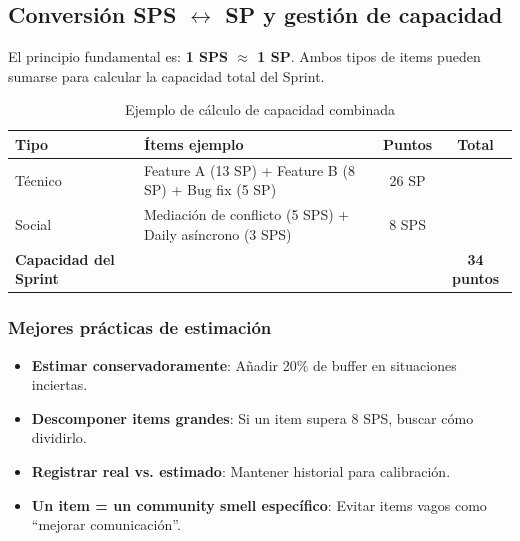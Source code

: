 \subsection{Conversión SPS \texorpdfstring{$\leftrightarrow$}{<->} SP y gestión de capacidad}

El principio fundamental es: \textbf{1 SPS $\approx$ 1 SP}. Ambos tipos de items pueden sumarse para calcular la capacidad total del Sprint.

\begin{table}[h]
    \centering
    \small
    \begin{tabularx}{\textwidth}{|l|X|c|c|}
        \hline
        \textbf{Tipo} & \textbf{Ítems ejemplo}                                   & \textbf{Puntos} & \textbf{Total} \\
        \hline
        Técnico
                      & Feature A (13 SP) + Feature B (8 SP) + Bug fix (5 SP)
                      & 26 SP
                      &                                                                                             \\
        \hline
        Social
                      & Mediación de conflicto (5 SPS) + Daily asíncrono (3 SPS)
                      & 8 SPS
                      &                                                                                             \\
        \hline
        \textbf{Capacidad del Sprint}
                      &
                      &
                      & \textbf{34 puntos}                                                                          \\
        \hline
    \end{tabularx}
    \caption{Ejemplo de cálculo de capacidad combinada}
    \label{tab:capacidad-combinada}
\end{table}
\FloatBarrier

\subsubsection{Mejores prácticas de estimación}

\begin{itemize}
    \item \textbf{Estimar conservadoramente}: Añadir 20\% de buffer en situaciones inciertas.
    \item \textbf{Descomponer items grandes}: Si un item supera 8 SPS, buscar cómo dividirlo.
    \item \textbf{Registrar real vs. estimado}: Mantener historial para calibración.
    \item \textbf{Un item = un community smell específico}: Evitar items vagos como ``mejorar comunicación''.
\end{itemize}

